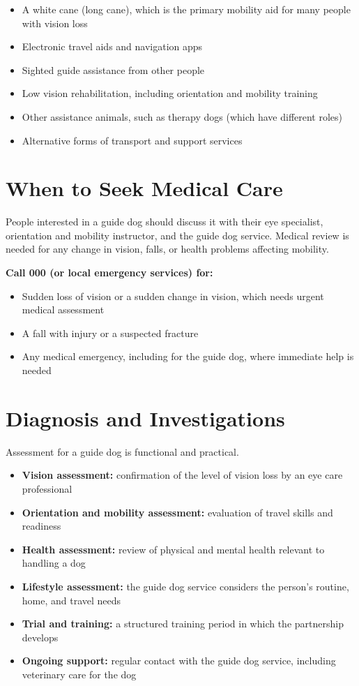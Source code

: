 \begin{itemize}
    \item A white cane (long cane), which is the primary mobility aid for many people with vision loss
    \item Electronic travel aids and navigation apps
    \item Sighted guide assistance from other people
    \item Low vision rehabilitation, including orientation and mobility training
    \item Other assistance animals, such as therapy dogs (which have different roles)
    \item Alternative forms of transport and support services
\end{itemize}

\section*{When to Seek Medical Care}
People interested in a guide dog should discuss it with their eye specialist, orientation and mobility instructor, and the guide dog service. Medical review is needed for any change in vision, falls, or health problems affecting mobility.

\textbf{Call 000 (or local emergency services) for:}
\begin{itemize}
    \item Sudden loss of vision or a sudden change in vision, which needs urgent medical assessment
    \item A fall with injury or a suspected fracture
    \item Any medical emergency, including for the guide dog, where immediate help is needed
\end{itemize}

\section*{Diagnosis and Investigations}
Assessment for a guide dog is functional and practical.

\begin{itemize}
    \item \textbf{Vision assessment:} confirmation of the level of vision loss by an eye care professional
    \item \textbf{Orientation and mobility assessment:} evaluation of travel skills and readiness
    \item \textbf{Health assessment:} review of physical and mental health relevant to handling a dog
    \item \textbf{Lifestyle assessment:} the guide dog service considers the person's routine, home, and travel needs
    \item \textbf{Trial and training:} a structured training period in which the partnership develops
    \item \textbf{Ongoing support:} regular contact with the guide dog service, including veterinary care for the dog
\end{itemize}

